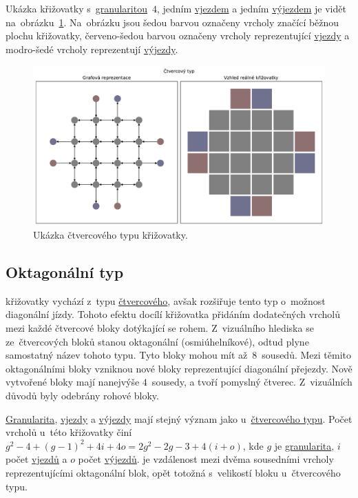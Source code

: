Ukázka křižovatky s~\hyperref[par:granularita]{granularitou}~$4$, jedním \hyperref[par:vjezdy]{vjezdem} a
jedním \hyperref[par:vyjezdy]{výjezdem} je vidět na~obrázku~\ref{fig:square_type_graph}.
Na~obrázku jsou šedou barvou označeny vrcholy značící běžnou plochu křižovatky,
červeno-šedou barvou označeny vrcholy reprezentující \hyperref[par:vjezdy]{vjezdy} a
modro-šedé vrcholy reprezentují \hyperref[par:vyjezdy]{výjezdy}.

\begin{figure}[h]
	\centering
	\includegraphics[width=\textwidth]{../img/Square_grid}
	\caption{Ukázka čtvercového typu křižovatky.}
	\label{fig:square_type_graph}
\end{figure}

\subsection{Oktagonální typ}\label{subsec:oktagonalni_typ}

 křižovatky vychází z~typu \hyperref[subsec:ctvercovy_typ]{čtvercového},
avšak rozšiřuje tento typ o~možnost diagonální jízdy.
Tohoto efektu docílí křižovatka přidáním dodatečných vrcholů mezi každé čtvercové bloky dotýkající se rohem.
Z~vizuálního hlediska se ze~čtvercových bloků stanou oktagonální (osmiúhelníkové),
odtud plyne samostatný název tohoto typu.
Tyto bloky mohou mít až~$8$~sousedů.
Mezi těmito oktagonálními bloky vzniknou nové bloky reprezentující diagonální přejezdy.
Nově vytvořené bloky mají nanejvýše $4$~sousedy, a tvoří pomyslný čtverec.
Z~vizuálních důvodů byly odebrány rohové bloky.

\hyperref[par:granularita]{Granularita}, \hyperref[par:vjezdy]{vjezdy} a \hyperref[par:vyjezdy]{výjezdy}
mají stejný význam jako u~\hyperref[subsec:ctvercovy_typ]{čtvercového typu}.
Počet vrcholů u~této křižovatky činí $g^2 - 4 + (g-1)^2 + 4i + 4o = 2g^2 - 2g - 3 + 4(i + o)$,
kde $g$ je \hyperref[par:granularita]{granularita},
$i$ počet \hyperref[par:vjezdy]{vjezdů} a $o$ počet \hyperref[par:vyjezdy]{výjezdů}.
 je vzdálenost mezi dvěma sousedními vrcholy reprezentujícími oktagonální blok,
opět totožná s~velikostí bloku u~čtvercového typu.

